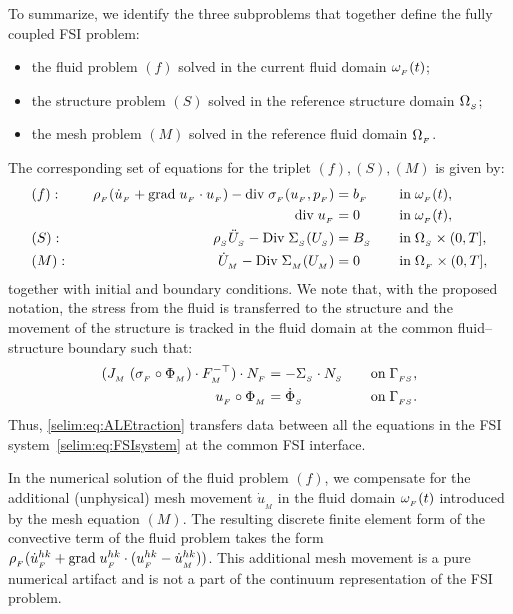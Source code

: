 To summarize, we identify the three subproblems that together define
the fully coupled FSI problem:
\begin{itemize}
  \item the fluid problem $(f)$ solved in the current fluid domain
  $\omega_{_{F}}(t)$;

  \item the structure problem $(S)$ solved in the reference structure
  domain $\Omega_{_{S}}$;

  \item the mesh problem $(M)$ solved in the reference fluid domain $\Omega_{_{F}}$.
\end{itemize}
The corresponding set of equations for the triplet
$(f),(S),(M)$ is given by:
\begin{align}
  \label{selim:eq:FSIsystem}
  &(f):&\quad
  \rho_{_{F}}(\dot{u}_{_{F}} + \textrm{grad}\;u_{_{F}}\cdot u_{_{F}}) - \textrm{div}\;\sigma_{_{F}}(u_{_{F}},p_{_{F}}) &= b_{_{F}}
  \quad&&\textrm{in}\;\omega_{_{F}}(t),
  \\
  &&
  \textrm{div}\;u_{_{F}} &= 0
  \quad&&\textrm{in}\;\omega_{_{F}}(t),
  \\
  &(S):&\quad
  \rho_{_{S}} \ddot{U}_{_{S}} - \textrm{Div}\; \Sigma_{_{S}}(U_{_{S}}) &= B_{_{S}}
  \quad&&\textrm{in}\;\Omega_{_{S}}\times(0,T],
  \\
  &(M):&\quad
  \dot{U}_{_{M}} - \textrm{Div}\; \Sigma_{_{M}}(U_{_{M}}) &= 0
  \quad&&\textrm{in}\;\Omega_{_{F}}\times(0,T],
\end{align}
together with initial and boundary conditions. We note that, with the
proposed notation, the stress from the fluid is transferred to the
structure and the movement of the structure is tracked in the fluid
domain at the common fluid--structure boundary such that:
\begin{align}
  \label{selim:eq:ALEtraction}
  (J_{_{M}}\;(\sigma_{_{F}}\circ\Phi_{_{M}}) \cdot F_{_{M}}^{-\top})\cdot
  N_{_{F}} &= - \Sigma_{_{S}}\cdot N_{_{S}}
  \quad &&\textrm{on}\;\Gamma_{_{FS}},
  \\
  u_{_{F}}\circ\Phi_{_{M}} &= \dot{\Phi}_{_{S}}
  \quad &&\textrm{on}\;\Gamma_{_{FS}}.
\end{align}
Thus, \eqref{selim:eq:ALEtraction} transfers data between all the
equations in the FSI system~\eqref{selim:eq:FSIsystem} at the common
FSI interface.

In the numerical solution of the fluid problem $(f)$, we compensate
for the additional (unphysical) mesh movement $\dot{u}_{_{M}}$ in the
fluid domain $\omega_{_{F}}(t)$ introduced by the mesh equation $(M)$.  The
resulting discrete finite element form of the convective term of the
fluid problem takes the form $\rho_{_{F}}(\dot{u}_{_{F}}^{hk} +
\textrm{grad}\;u_{_{F}}^{hk}\cdot(u_{_{F}}^{hk} - \dot{u}_{_{M}}^{hk}))$. This additional mesh
movement is a pure numerical artifact and is not a part of the
continuum representation of the FSI problem.

